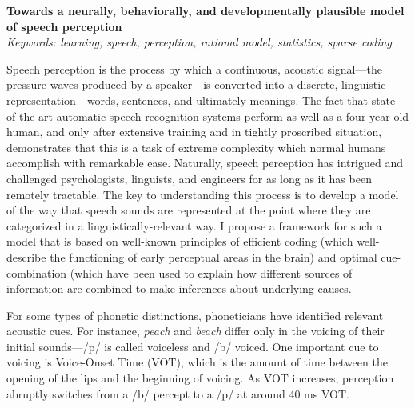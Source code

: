 \documentclass[12pt]{article}
\begin{document}
\begin{center}
  \textbf{Towards a neurally, behaviorally, and developmentally plausible model of speech perception}
  \\
 \textit{Keywords: learning, speech, perception, rational model, statistics, sparse coding}
\end{center}

\vspace{-1em}
Speech perception is the process by which a continuous, acoustic signal---the pressure waves produced by a speaker---is converted into a discrete, linguistic representation---words, sentences, and ultimately meanings.  The fact that state-of-the-art automatic speech recognition systems perform as well as a four-year-old human, and only after extensive training and in tightly proscribed situation, demonstrates that this is a task of extreme complexity which normal humans accomplish with remarkable ease.  Naturally, speech perception has intrigued and challenged psychologists, linguists, and engineers for as long as it has been remotely tractable.  The key to understanding this process is to develop a model of the way that speech sounds are represented at the point where they are categorized in a linguistically-relevant way.  I propose a framework for such a model that is based on well-known principles of efficient coding (which well-describe the functioning of early perceptual areas in the brain) and optimal cue-combination (which have been used to explain how different sources of information are combined to make inferences about underlying causes.


For some types of phonetic distinctions, phoneticians have identified relevant acoustic cues.  For instance, \emph{peach} and \emph{beach} differ only in the voicing of their initial sounds---/p/ is called voiceless and /b/ voiced.  One important cue to voicing is Voice-Onset Time (VOT), which is the amount of time between the opening of the lips 
and the beginning of voicing.  As VOT increases, perception abruptly switches from a /b/ percept to a /p/ at around 40 ms VOT.
\end{document}
